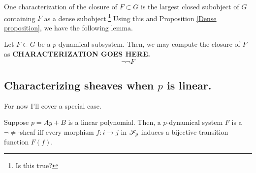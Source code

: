 \documentclass{amsart}
\begin{document}
One characterization of the closure of $F\subset G$ is the largest closed subobject of $G$ containing $F$ as a dense subobject.\footnote{\color{magenta} Is this true?}
Using this and Proposition \ref{Dense proposition}, we have the following lemma.
\begin{lemma}
  Let $F \subset G$ be a $p$-dynamical subsystem.
  Then, we may compute the closure of $F$ as \textbf{CHARACTERIZATION GOES HERE.} 
  \[
    \neg \neg F
  \]
\end{lemma}

\subsection{Characterizing sheaves when $p$ is linear.}
For now I'll cover a special case.
\begin{proposition}\label{Linear polynomial proposition}
  Suppose $p = Ay + B$ is a linear polynomial.
  Then, a $p$-dynamical system $F$ is a $\neg\neq$-sheaf iff every morphism $f:i \rightarrow j$ in $\mathscr{F}_p$ induces a bijective transition function $F(f)$.
\end{proposition}
\end{document}
